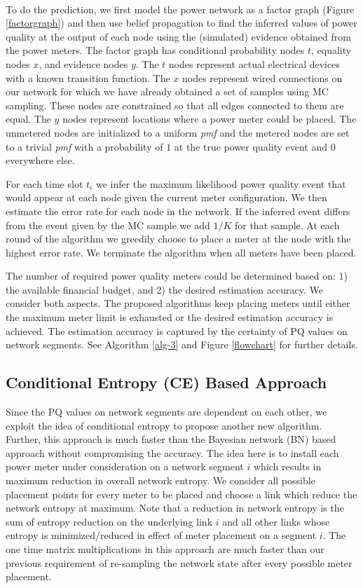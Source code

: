 \noindent \\
To do the prediction, we first model the power network as a factor graph (Figure \ref{factorgraph}) and then use belief propagation to find the inferred values of power quality at the output of each node using the (simulated) evidence obtained from the power meters. The factor graph has conditional probability nodes $t$, equality nodes $x$, and evidence nodes $y$. The $t$ nodes represent actual electrical devices with a known transition function. The $x$ nodes represent wired connections on our network for which we have already obtained a set of samples using MC sampling. These nodes are constrained so that all edges connected to them are equal. The $y$ nodes represent locations where a power meter could be placed. The unmetered nodes are initialized to a uniform \emph{pmf} and the metered nodes are set to a trivial \emph{pmf} with a probability of $1$ at the true power quality event and $0$ everywhere else. 

For each time slot $t_{i}$ we infer the maximum likelihood power
quality event that would appear at each node given the current meter
configuration. We then estimate the error rate for each node in the
network. If the inferred event differs from the event given by the
MC sample we add $1/K$ for that sample. At each round of the algorithm
we greedily choose to place a meter at the node with the highest error
rate. We terminate the algorithm when all meters have been placed.

The number of required power quality meters could be determined based on: 1) the available financial budget, and 2) the desired estimation accuracy. We consider both aspects. The proposed algorithms keep placing meters until either the maximum meter limit is exhausted or the desired estimation accuracy is achieved. The estimation accuracy is captured by the certainty of PQ values on network segments. See Algorithm \ref{alg-3} and Figure \ref{flowchart} for further details.

\subsection{Conditional Entropy (CE) Based Approach}
Since the PQ values on network segments are dependent on each other, we exploit the idea of conditional entropy to propose another new algorithm. Further, this approach is much faster than the Bayesian network (BN) based approach without compromising the accuracy. The idea here is to install each power meter under consideration on a network segment $i$ which results in maximum reduction in overall network entropy. We consider all possible placement points for every meter to be placed and choose a link which reduce the network entropy at maximum. Note that a reduction in network entropy is the sum of entropy reduction on the underlying link $i$ and all other links whose entropy is minimized/reduced in effect of meter placement on a segment $i$. The one time matrix multiplications in this approach are much faster than our previous requirement of re-sampling the network state after every possible meter placement.

